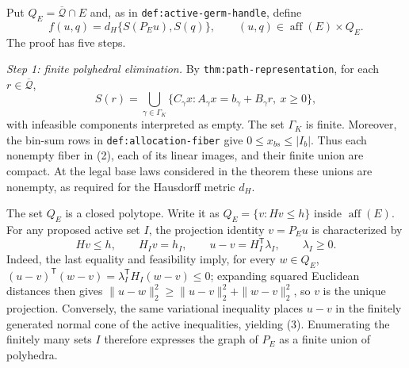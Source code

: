 Put \(Q_E=\overline{\mathcal Q}\cap E\) and, as in \texttt{def:active-germ-handle}, define
\[
 f(u,q)=d_H\{S(P_Eu),S(q)\},
 \qquad (u,q)\in\operatorname{aff}(E)\times Q_E.
\tag{1}
\]
The proof has five steps.

\emph{Step 1: finite polyhedral elimination.}
By \texttt{thm:path-representation}, for each \(r\in\overline{\mathcal Q}\),
\[
 S(r)=\bigcup_{\gamma\in\Gamma_K}
 \{C_\gamma x:A_\gamma x=b_\gamma+B_\gamma r,\ x\geq0\},
\tag{2}
\]
with infeasible components interpreted as empty.  The set \(\Gamma_K\) is finite.  Moreover, the bin-sum rows in \texttt{def:allocation-fiber} give \(0\leq x_{bs}\leq |I_b|\).  Thus each nonempty fiber in (2), each of its linear images, and their finite union are compact.  At the legal base laws considered in the theorem these unions are nonempty, as required for the Hausdorff metric \(d_H\).

The set \(Q_E\) is a closed polytope.  Write it as \(Q_E=\{v:Hv\leq h\}\) inside \(\operatorname{aff}(E)\).  For any proposed active set \(I\), the projection identity \(v=P_Eu\) is characterized by
\[
 Hv\leq h,\qquad H_Iv=h_I,\qquad
 u-v=H_I^{\mathsf T}\lambda_I,\qquad \lambda_I\geq0.
\tag{3}
\]
Indeed, the last equality and feasibility imply, for every \(w\in Q_E\),
\((u-v)^{\mathsf T}(w-v)=\lambda_I^{\mathsf T}H_I(w-v)\leq0\); expanding squared Euclidean distances then gives \(\|u-w\|_2^2\geq\|u-v\|_2^2+\|w-v\|_2^2\), so \(v\) is the unique projection.  Conversely, the same variational inequality places \(u-v\) in the finitely generated normal cone of the active inequalities, yielding (3).  Enumerating the finitely many sets \(I\) therefore expresses the graph of \(P_E\) as a finite union of polyhedra.

